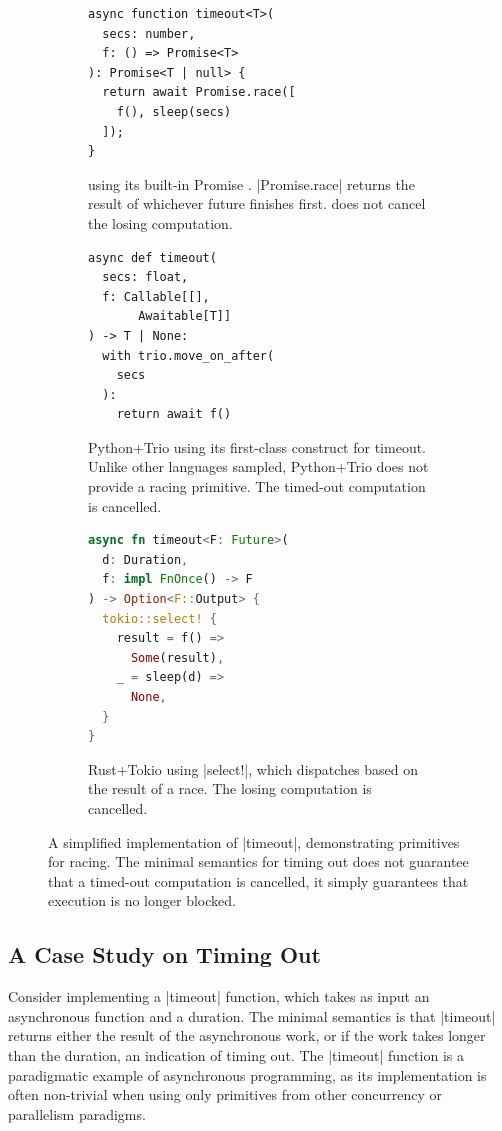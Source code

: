 \begin{figure}[t]
  \begin{subfigure}{0.33\linewidth}
\begin{lstlisting}[language=Js]
async function timeout<T>(
  secs: number,
  f: () => Promise<T>
): Promise<T | null> {
  return await Promise.race([
    f(), sleep(secs)
  ]);
}
\end{lstlisting}
\cprotect\caption{\Js using its built-in Promise . \code|Promise.race| returns the result of whichever future finishes first. \Js does not cancel the losing computation.}
  \end{subfigure}
  \hfill
  \begin{subfigure}{0.30\linewidth}
  \begin{lstlisting}[language=Py]
async def timeout(
  secs: float,
  f: Callable[[],
       Awaitable[T]]
) -> T | None:
  with trio.move_on_after(
    secs
  ):
    return await f()
\end{lstlisting}
  \cprotect\caption{Python+Trio using its first-class construct for timeout. Unlike other languages sampled, Python+Trio does not provide a racing primitive. The timed-out computation is cancelled.}
  \label{fig:timeout-simple-trio}
\end{subfigure}
  \hfill%
  \begin{subfigure}{0.32\linewidth}
  \begin{lstlisting}[language=Rust]
async fn timeout<F: Future>(
  d: Duration,
  f: impl FnOnce() -> F
) -> Option<F::Output> {
  tokio::select! {
    result = f() =>
      Some(result),
    _ = sleep(d) =>
      None,
  }
}
\end{lstlisting}
  \cprotect\caption{Rust+Tokio using \code|select!|, which dispatches based on the result of a race. The losing computation is cancelled.}
  \end{subfigure}
\cprotect\caption{A simplified implementation of \code|timeout|, demonstrating primitives for racing. The minimal semantics for timing out does not guarantee that a timed-out computation is cancelled, it simply guarantees that execution is no longer blocked.}
\label{fig:timeout-simple}
\end{figure}

\subsection{A Case Study on Timing Out}
\label{sec:timeout}

Consider implementing a \code|timeout| function, which takes as input an asynchronous function and a duration. The minimal semantics is that \code|timeout| returns either the result of the asynchronous work, or if the work takes longer than the duration, an indication of timing out. The \code|timeout| function is a paradigmatic example of asynchronous programming, as its implementation is often non-trivial when using only primitives from other concurrency or parallelism paradigms.

